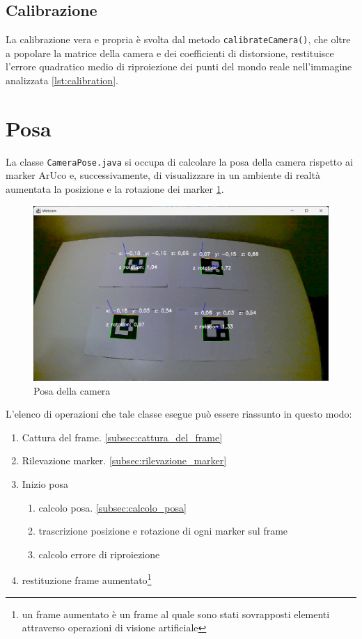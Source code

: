 \documentclass[12pt,a4paper,openright,twoside]{book}
\begin{document}
\subsection{Calibrazione}
La calibrazione vera e propria è svolta dal metodo \texttt{calibrateCamera()}, che oltre a popolare la matrice della camera e dei coefficienti di distorsione, restituisce l'errore quadratico medio di riproiezione dei punti del mondo reale nell'immagine analizzata \cref{lst:calibration}.


\section{Posa}
La classe \texttt{CameraPose.java} si occupa di calcolare la posa della camera rispetto ai marker ArUco e, successivamente, di visualizzare in un ambiente di realtà aumentata la posizione e la rotazione dei marker \ref{fig:camera_pose_example}.
\begin{figure}
	\centering
	\includegraphics[width=0.9\linewidth]{./figures/test/figure2.png}
	\caption{Posa della camera}
	\label{fig:camera_pose_example}
\end{figure}

L'elenco di operazioni che tale classe esegue può essere riassunto in questo modo:
\begin{enumerate}
	\item Cattura del frame. \ref{subsec:cattura_del_frame}
	\item Rilevazione marker. \ref{subsec:rilevazione_marker}
	\item Inizio posa
	\begin{enumerate}
		\item calcolo posa. \ref{subsec:calcolo_posa}
		\item trascrizione posizione e rotazione di ogni marker sul frame
		\item calcolo errore di riproiezione
	\end{enumerate}
	\item restituzione frame aumentato\footnote{un frame aumentato è un frame al quale sono stati sovrapposti elementi attraverso operazioni di visione artificiale}
\end{enumerate}
\end{document}
